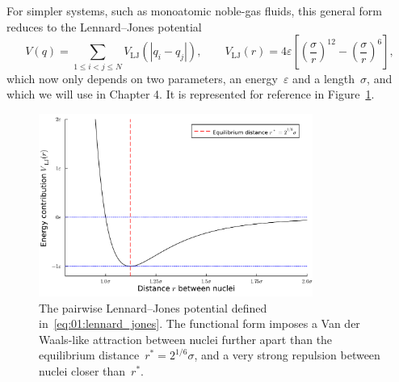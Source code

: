 For simpler systems, such as monoatomic noble-gas fluids, this general form reduces to the Lennard--Jones potential
\begin{equation}
    \label{eq:01:lennard_jones}
    V(q) = \sum_{1\leq i < j \leq N} V_{\mathrm{LJ}}\left(|q_i-q_j|\right),\qquad V_{\mathrm{LJ}}(r) = 4\varepsilon \left[\left(\frac{\sigma}{r}\right)^{12}-\left(\frac{\sigma}{r}\right)^6\right],
\end{equation}
which now only depends on two parameters, an energy~$\varepsilon$ and a length~$\sigma$, and which we will use in Chapter 4. It is represented for reference in Figure~\ref{01:fig:lj}.
\begin{figure}
    \centering
    \includegraphics[width=0.8\textwidth]{figures/01/lj.pdf}
    \caption[The Lennard--Jones pairwise potential]{The pairwise Lennard--Jones potential defined in~\eqref{eq:01:lennard_jones}. The functional form imposes a Van der Waals-like attraction between nuclei further apart than the equilibrium distance~$r^*=2^{1/6}\sigma$, and a very strong repulsion between nuclei closer than~$r^*$.}
    \label{01:fig:lj}
\end{figure}

